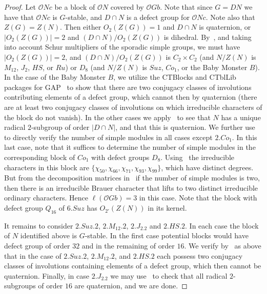 \documentclass{amsart}
\theoremstyle{plain}\newtheorem{Theorem}{Theorem}[section]
\theoremstyle{plain}\newtheorem{Conjecture}[Theorem]{Conjecture}
\theoremstyle{plain}\newtheorem{Corollary}[Theorem]{Corollary}
\theoremstyle{plain}\newtheorem{Lemma}[Theorem]{Lemma}
\theoremstyle{plain}\newtheorem{Proposition}[Theorem]{Proposition}
\theoremstyle{definition}\newtheorem{Definition}[Theorem]{Definition}
\theoremstyle{definition}\newtheorem{Example}[Theorem]{Example}
\theoremstyle{definition}\newtheorem{Examples}[Theorem]{Examples}
\theoremstyle{definition}\newtheorem{Exercise}[Theorem]{Exercise}
\theoremstyle{definition}\newtheorem{Notation}[Theorem]{Notation}
\theoremstyle{definition}\newtheorem{Remark}[Theorem]{Remark}
\theoremstyle{definition}\newtheorem{Remarks}[Theorem]{Remarks}
\def\CO{{\mathcal{O}}}    \def\OPE{{\mathcal{O}(P\rtimes E)}}
\numberwithin{equation}{section}
\begin{document}
\begin{proof}


Let $\CO Nc$ be a block of $\CO N$ covered by $\CO Gb$. Note that since $G=DN$ we have that $\CO Nc$ is $G$-stable, and $D \cap N$ is a defect group for $\CO Nc$. Note also that $Z(G)=Z(N)$. Then either $O_2(Z(G))=1$ and $D \cap N$ is quaternion, or $|O_2(Z(G))|=2$ and $(D \cap N)/O_2(Z(G))$ is dihedral. By~\cite{landrock}, and taking into account Schur multipliers of the sporadic simple groups, we must have $|O_2(Z(G))|=2$, and $(D \cap N)/O_2(Z(G))$ is $C_2 \times C_2$ (and $N/Z(N)$ is $M_{12}$, $J_2$, $HS$, or $Ru$) or $D_8$ (and $N/Z(N)$ is $Suz$, $Co_1$, or the Baby Monster $B$). In the case of the Baby Monster $B$, we utilize the CTBlocks and CTblLib packages for GAP~\cite{GAP} to show that there are two conjugacy classes of involutions contributing elements of a defect group, which cannot then by quaternion (there are at least two conjugacy classes of involutions on which irreducible characters of the block do not vanish). In the other cases we  apply~\cite{GAP} to see that $N$ has a unique radical $2$-subgroup of order $|D \cap N|$, and that this is quaternion. We further use~\cite{GAP} to directly verify the number of simple modules in all cases except $2.Co_1$. In this last case, note that it suffices to determine the number of simple modules in the corresponding block of $Co_1$ with defect groups $D_8$. Using~\cite{GAP} the irreducible characters in this block are $\{\chi_{50},\chi_{66},\chi_{71},\chi_{93},\chi_{99}\}$, which have distinct degrees. But from the decomposition matrices in~\cite{er90} if the number of simple modules is two, then there is an irreducible Brauer character that lifts to two distinct irreducible ordinary characters. Hence $\ell(\CO Gb)=3$ in this case. Note that the block with defect group $Q_{16}$ of $6.Suz$ has $O_{2'}(Z(N))$ in its kernel.  

It remains to consider $2.Suz.2$, $2.M_{12}.2$, $2.J_2.2$ and $2.HS.2$. In each case the block of $N$ identified above is $G$-stable. In the first case potential blocks would have defect group of order $32$ and in the remaining of order $16$. We verify by~\cite{GAP} as above that in the case of $2.Suz.2$, $2.M_{12}.2$, and $2.HS.2$ each possess two conjugacy classes of involutions containing elements of a defect group, which then cannot be quaternion. Finally, in case $2.J_2.2$ we may use~\cite{GAP} to check that all radical $2$-subgroups of order $16$ are quaternion, and we are done.
\end{proof}
\end{document}
